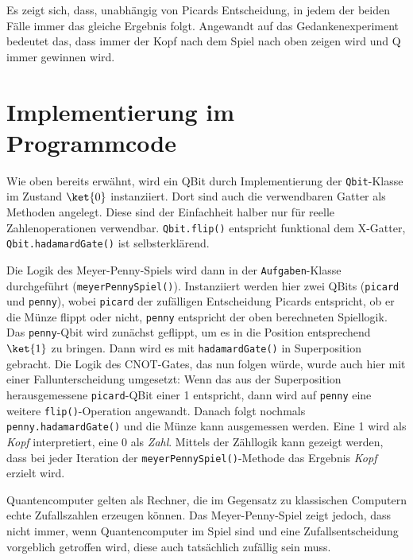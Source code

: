 Es zeigt sich, dass, unabhängig von Picards Entscheidung, in jedem der beiden Fälle immer das gleiche Ergebnis folgt.
Angewandt auf das Gedankenexperiment bedeutet das, dass immer der Kopf nach dem Spiel nach oben zeigen wird und Q immer gewinnen wird.

\section{Implementierung im Programmcode}
Wie oben bereits erwähnt, wird ein QBit durch Implementierung der \texttt{Qbit}-Klasse im Zustand $\ket{0}$ instanziiert.
Dort sind auch die verwendbaren Gatter als Methoden angelegt.
Diese sind der Einfachheit halber nur für reelle Zahlenoperationen verwendbar.
\texttt{Qbit.flip()} entspricht funktional dem X-Gatter, \texttt{Qbit.hadamardGate()} ist selbsterklärend.

Die Logik des Meyer-Penny-Spiels wird dann in der \texttt{Aufgaben}-Klasse durchgeführt (\texttt{meyer\allowbreak PennySpiel()}).
Instanziiert werden hier zwei QBits (\texttt{picard} und \texttt{penny}), wobei \texttt{picard} der zufälligen Entscheidung Picards entspricht, ob er die Münze flippt oder nicht, \texttt{penny} entspricht der oben berechneten Spiellogik. 
Das \texttt{penny}-Qbit wird zunächst geflippt, um es in die Position entsprechend $\ket{1}$ zu bringen.
Dann wird es mit \texttt{hadamardGate()} in Superposition gebracht.
Die Logik des CNOT-Gates, das nun folgen würde, wurde auch hier mit einer Fallunterscheidung umgesetzt: 
Wenn das aus der Superposition herausgemessene \texttt{picard}-QBit einer 1 entspricht, dann wird auf \texttt{penny} eine weitere \texttt{flip()}-Operation angewandt.
Danach folgt nochmals \texttt{penny.hadamardGate()} und die Münze kann ausgemessen werden.
Eine 1 wird als \textit{Kopf} interpretiert, eine 0 als \textit{Zahl}.
Mittels der Zähllogik kann gezeigt werden, dass bei jeder Iteration der \texttt{meyerPennySpiel()}-Methode das Ergebnis \textit{Kopf} erzielt wird.

Quantencomputer gelten als Rechner, die im Gegensatz zu klassischen Computern echte Zufallszahlen erzeugen können. 
Das Meyer-Penny-Spiel zeigt jedoch, dass nicht immer, wenn Quantencomputer im Spiel sind und eine Zufallsentscheidung vorgeblich getroffen wird, diese auch tatsächlich zufällig sein muss.